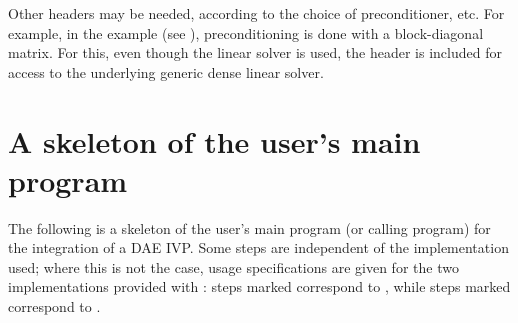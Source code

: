 Other headers may be needed, according to the choice of
preconditioner, etc.  For example, in the 
example (see \cite{ida_ex}), preconditioning is done with a
block-diagonal matrix. For this, even though the {\idaspgmr} linear
solver is used, the header  is included for
access to the underlying generic dense linear solver.

\section{A skeleton of the user's main program}\label{ss:skeleton_sim}
The following is a skeleton of the user's main program (or calling
program) for the integration of a DAE IVP. Some steps are independent of the
{\nvector} implementation used; where this is not the case, usage specifications
are given for the two implementations provided with {\ida}: steps marked {\p}
correspond to {\nvecp}, while steps marked {\s} correspond to {\nvecs}.
